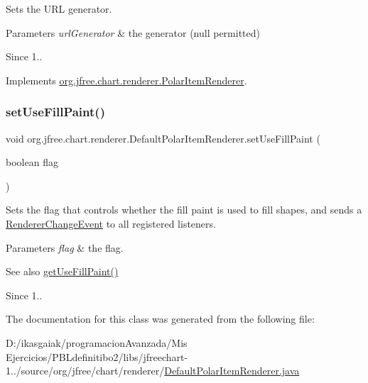 Sets the U\+RL generator.


\begin{DoxyParams}{Parameters}
{\em url\+Generator} & the generator ({\ttfamily null} permitted)\\
\hline
\end{DoxyParams}
\begin{DoxySince}{Since}
1.. 
\end{DoxySince}


Implements \mbox{\hyperlink{interfaceorg_1_1jfree_1_1chart_1_1renderer_1_1_polar_item_renderer_a8809317358c46f995ce56e79857ff96e}{org.\+jfree.\+chart.\+renderer.\+Polar\+Item\+Renderer}}.

\mbox{\label{classorg_1_1jfree_1_1chart_1_1renderer_1_1_default_polar_item_renderer_a06d38abcaf202f22bf90deae6d93d3bb}} 
\subsubsection{\texorpdfstring{set\+Use\+Fill\+Paint()}{setUseFillPaint()}}
{\footnotesize\ttfamily void org.\+jfree.\+chart.\+renderer.\+Default\+Polar\+Item\+Renderer.\+set\+Use\+Fill\+Paint (\begin{DoxyParamCaption}\item[{boolean}]{flag }\end{DoxyParamCaption})}

Sets the flag that controls whether the fill paint is used to fill shapes, and sends a \mbox{\hyperlink{}{Renderer\+Change\+Event}} to all registered listeners.


\begin{DoxyParams}{Parameters}
{\em flag} & the flag.\\
\hline
\end{DoxyParams}
\begin{DoxySeeAlso}{See also}
\mbox{\hyperlink{classorg_1_1jfree_1_1chart_1_1renderer_1_1_default_polar_item_renderer_a7112620182765d93886d482a94cf2b48}{get\+Use\+Fill\+Paint()}} 
\end{DoxySeeAlso}
\begin{DoxySince}{Since}
1.. 
\end{DoxySince}


The documentation for this class was generated from the following file\+:\begin{DoxyCompactItemize}
\item 
D\+:/ikasgaiak/programacion\+Avanzada/\+Mis Ejercicios/\+P\+B\+Ldefinitibo2/libs/jfreechart-\/1../source/org/jfree/chart/renderer/\mbox{\hyperlink{_default_polar_item_renderer_8java}{Default\+Polar\+Item\+Renderer.\+java}}\end{DoxyCompactItemize}
